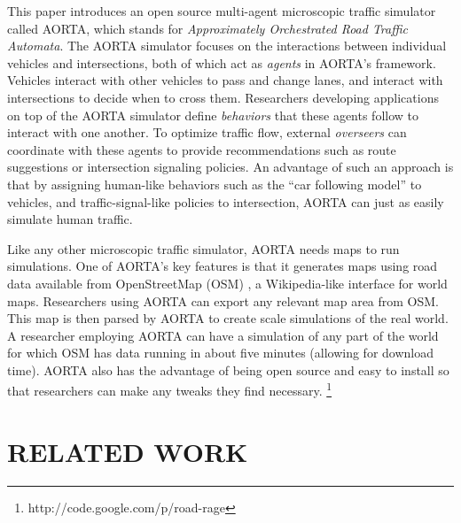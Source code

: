 \documentclass[letterpaper, 10 pt, conference]{ieeeconf}  %
\begin{document}

This paper introduces an open source multi-agent microscopic traffic
simulator called AORTA, which stands for \textit{Approximately
Orchestrated Road Traffic Automata}. The AORTA simulator focuses on
the interactions between individual vehicles and intersections, both
of which act as \textit{agents} in AORTA's framework. Vehicles
interact with other vehicles to pass and change lanes, and interact
with intersections to decide when to cross them. Researchers
developing applications on top of the AORTA simulator define
\textit{behaviors} that these agents follow to interact with one
another. To optimize traffic flow, external \textit{overseers} can
coordinate with these agents to provide recommendations such as route
suggestions or intersection signaling policies.  An advantage of such
an approach is that by assigning human-like behaviors such as the
``car following model'' \cite{brackstone1999car} to vehicles, and
traffic-signal-like policies to intersection, AORTA can just as easily
simulate human traffic.

Like any other microscopic traffic simulator, AORTA needs maps to run
simulations. One of AORTA's key features is that it generates maps using road
data available from OpenStreetMap (OSM) \cite{osm}, a Wikipedia-like interface
for world maps. Researchers using AORTA can export any relevant map area from
OSM. This map is then parsed by AORTA to create scale simulations of the real
world. A researcher employing AORTA can have a simulation of any part of the
world for which OSM has data running in about five minutes (allowing for
download time).  AORTA also has the advantage of being open source and easy to
install so that researchers can make any tweaks they find necessary.
\footnote{http://code.google.com/p/road-rage}




\section{RELATED WORK}
\label{sec:related_work}
\end{document}
